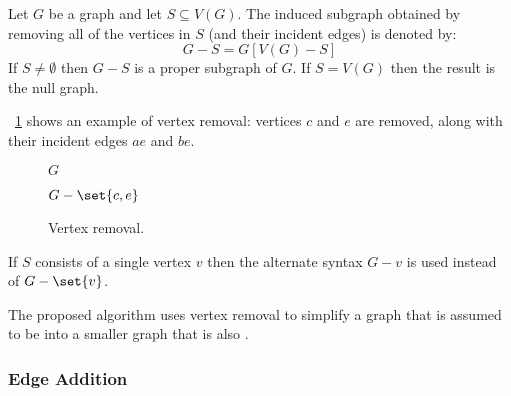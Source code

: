 Let \(G\) be a graph and let \(S\subseteq V(G)\).  The induced subgraph obtained by removing all of the vertices in
\(S\) (and their incident edges) is denoted by:
\[G-S=G[V(G)-S]\]
If \(S\ne\emptyset\) then \(G-S\) is a proper subgraph of \(G\).  If \(S=V(G)\) then the result is the null graph.

\figurename~\ref{fig:vremove} shows an example of vertex removal: vertices \(c\) and \(e\) are removed, along with
their incident edges \(ae\) and \(be\).

\begin{figure}[H]
  \begin{minipage}{2.75in}
    \centering

    \bigskip

    \(G\)
  \end{minipage}
  \begin{minipage}{3in}
    \centering

    \bigskip

    \(G-\set{c,e}\)
  \end{minipage}
  \caption{Vertex removal.}
  \label{fig:vremove}
\end{figure}

If \(S\) consists of a single vertex \(v\) then the alternate syntax \(G-v\) is used instead of \(G-\set{v}\).

The proposed algorithm uses vertex removal to simplify a graph that is assumed to be  into a smaller
graph that is also .

\subsubsection{Edge Addition}\label{sec:sub:sub:eadd}

